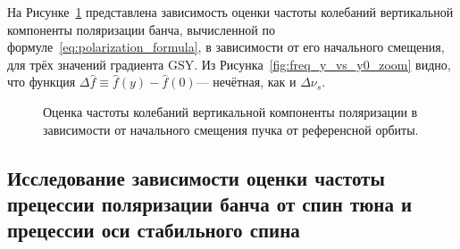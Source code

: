 На Рисунке~\ref{fig:freq_y_vs_y0} представлена зависимость оценки частоты колебаний вертикальной компоненты поляризации банча, вычисленной по формуле~\eqref{eq:polarization_formula}, в зависимости от его начального смещения, для трёх значений градиента GSY. Из Рисунка~\ref{fig:freq_y_vs_y0_zoom} видно, что функция $\Delta\hat f \equiv \hat f(y) - \hat f(0)$--- нечётная, как и $\Delta\nu_s$.
\begin{figure}[!h]
	\centering
	\hfill
		\hfill
		\hfill
	\caption{Оценка частоты колебаний вертикальной компоненты поляризации в зависимости от начального смещения пучка от референсной орбиты.\label{fig:freq_y_vs_y0}}
\end{figure}

\subsection{Исследование зависимости оценки частоты прецессии поляризации банча от спин тюна и прецессии оси стабильного спина}\label{sec:SpinTune_and_SPA_dependence}

